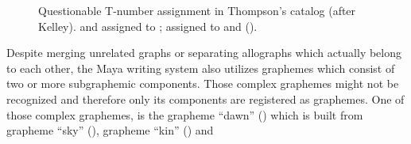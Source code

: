 \documentclass[../main.tex]{subfiles}
\begin{document}
\begin{figure}
    \centering
    \caption[Questionable T-number assignment in Thompson's catalog]{Questionable T-number 
            assignment in Thompson's catalog (after Kelley).
              and  
            assigned to ;
              assigned to  and 
             (\authordrawings).}
\end{figure}
Despite merging unrelated graphs or separating allographs which actually belong to each other,
the Maya writing system also utilizes graphemes which consist of two or more subgraphemic 
components.
Those complex graphemes might not be recognized and therefore only its components are registered
as graphemes.
One of those complex graphemes, is the grapheme  ``dawn'' 
() which is built from
grapheme  ``sky'' (), 
grapheme  ``k\glottalstop{}in'' () and
\end{document}
